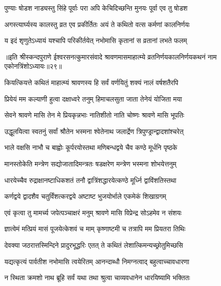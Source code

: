 \twolineshloka
{पुण्याः षोडश नाड्यस्तु सिंहे पूर्वाः परा अपि}
{केचिदिच्छन्ति मुनयः पूर्वा एव तु षोडश} %

\twolineshloka
{अगस्त्यार्घ्यस्य कालस्तु व्रत एव प्रकीर्तितः}
{अयं ते कथितो वत्स कर्मणां कालनिर्णयः} %

\twolineshloka
{य इदं शृणुतेऽध्यायं यश्चापि परिकीर्तयेत्}
{नभोमासि कृतानां स व्रतानां लभते फलम्} %


{॥इति श्रीस्कन्दपुराणे ईश्वरसनत्कुमारसंवादे श्रावणमासमाहात्म्ये व्रतनिर्णयकालनिर्णयकथनं नाम एकोनत्रिंशोऽध्यायः॥२९॥}





\twolineshloka
{कियत्कियत्ते कथितं माहात्म्यं श्रावणस्य हि}
{सर्वं वर्णयितुं शक्यं नालं वर्षशतैरपि} %

\twolineshloka
{प्रियेयं मम कल्याणी हुत्वा दक्षाध्वरे तनुम्}
{हिमाचलसुता जाता तेनेयं योजिता मया} %

\twolineshloka
{सेवने श्रावणे मासि तेन मे प्रियकृन्नभाः}
{नातिशीतो नाति चोष्णः श्रावणे मासि भूपतिः} %

\twolineshloka
{उद्धूलयित्वा स्वतनुं सर्वां श्रौतेन भस्मना}
{श्वेतेनाथ जलार्द्रेण त्रिपुण्ड्रान्द्वादशांश्चरेत्} %

\twolineshloka
{भाले वक्षसि नाभौ च बाह्वोः कूर्परयोस्तथा}
{मणिबन्धद्वये चैव कण्ठे मूर्धनि पृष्ठके} %

\twolineshloka
{मानस्तोकेति मन्त्रेण सद्योजातादिमन्त्रतः}
{षडक्षरेण मन्त्रेण भस्मना शोभयेत्तनुम्} %

\twolineshloka
{धारयेच्चैव रुद्राक्षानष्टाधिकशतं तनौ}
{द्वात्रिंशद्धारयेत्कण्ठे मूर्ध्नि द्वाविंशतिस्तथा} %

\twolineshloka
{कर्णद्वये द्वादशैव चतुर्विंशत्करद्वये}
{अष्टाष्ट भुजयोर्भाले एकमेकं शिखाग्रगम्} %

\twolineshloka
{एवं कृत्वा तु मामर्च्य जपेत्पञ्चाक्षरं मनुम्}
{श्रावणे मासि विप्रेन्द्र सोऽहमेव न संशयः} %

\twolineshloka
{ज्ञात्वेमं मत्प्रियं मासं पूजयेत्केशवं च माम्}
{कृष्णाष्टमी च तत्रापि मम प्रियतरा तिथिः} %

\twolineshloka
{देवक्या जठरात्तस्मिन्दिने प्रादुरभूद्धरिः}
{एतत् ते कथितं लेशात्किमन्यच्छ्रोतुमिच्छसि} %


\twolineshloka
{यद्यत्कृत्यं पार्वतीश नभोमासि त्वयेरितम्}
{आनन्दाब्धौ निमग्नत्वाद् बहुत्वाच्चावधारणा} %

\twolineshloka
{न स्थिता क्रमशो नाथ ब्रूहि सर्वं यथा तथा}
{श्रुत्वा चाव्यवधानेन धारयिष्यामि भक्तितः} %



